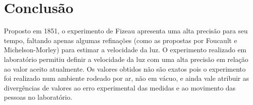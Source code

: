 \section{Conclusão}
Proposto em 1851, o experimento de Fizeau apresenta uma alta precisão para seu tempo, faltando apenas algumas refinações (como as propostas por Foucault e Michelson-Morley) para estimar a velocidade da luz. O experimento realizado em laboratório permitiu definir a velocidade da luz com uma alta precisão em relação ao valor aceito atualmente. Os valores obtidos não são exatos pois o experimento foi realizado num ambiente rodeado por ar, não em vácuo, e ainda vale atribuir as divergências de valores ao erro experimental das medidas e ao movimento das pessoas no laboratório.
 
